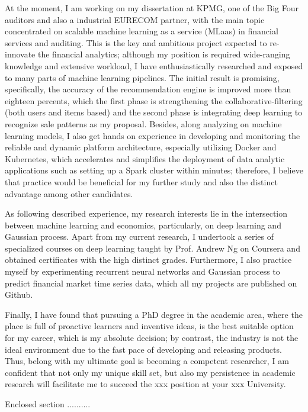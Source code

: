 \documentclass[11pt,a4paper,roman]{moderncv}        %
\begin{document}
At the moment, I am working on my dissertation at KPMG, one of the Big Four auditors and also a industrial EURECOM partner, with the main topic concentrated on scalable machine learning as a service (MLaas) in financial services and auditing. This is the key and ambitious project expected to re-innovate the financial analytics; although my position is required wide-ranging knowledge and extensive workload, I have enthusiastically researched and exposed to many parts of machine learning pipelines. The initial result is promising, specifically, the accuracy of the recommendation engine is improved more than eighteen percents, which the first phase is strengthening the collaborative-filtering (both users and items based) and the second phase is integrating deep learning to recognize sale patterns as my proposal. Besides, along analyzing on machine learning models, I also get hands on experience in developing and monitoring the reliable and dynamic platform architecture, especially utilizing Docker and Kubernetes, which accelerates and simplifies the deployment of data analytic applications such as setting up a Spark cluster within minutes; therefore, I believe that practice would be beneficial for my further study and also the distinct advantage among other candidates.

As following described experience, my research interests lie in the intersection between machine learning and economics, particularly, on deep learning and Gaussian process. Apart from my current research, I undertook a series of specialized courses on deep learning taught by Prof. Andrew Ng on Coursera and obtained certificates with the high distinct grades. Furthermore, I also practice myself by experimenting recurrent neural networks and Gaussian process to predict financial market time series data, which all my projects are published on Github.

Finally, I have found that pursuing a PhD degree in the academic area, where the place is full of proactive learners and inventive ideas, is the best suitable option for my career, which is my absolute decision; by contrast, the industry is not the ideal environment due to the fast pace of developing and releasing products. Thus, belong with my ultimate goal is becoming a competent researcher, I am confident that not only my unique skill set, but also my persistence in academic research will facilitate me to succeed the {xxx} position at your {xxx} University.

Enclosed section ..........



\vspace{0.5cm}


\makeletterclosing
\end{document}
